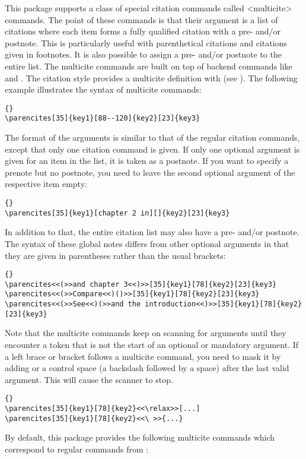 This package supports a class of special citation commands called <multicite> commands. The point of these commands is that their argument is a list of citations where each item forms a fully qualified citation with a pre- and\slash or postnote. This is particularly useful with parenthetical citations and citations given in footnotes. It is also possible to assign a pre- and\slash or postnote to the entire list. The multicite commands are built on top of backend commands like  and . The citation style provides a multicite definition with  (see ). The following example illustrates the syntax of multicite commands:

\begin{lstlisting}[style=latex]{}
\parencites[35]{key1}[88--120]{key2}[23]{key3}
\end{lstlisting}
%
The format of the arguments is similar to that of the regular citation commands, except that only one citation command is given. If only one optional argument is given for an item in the list, it is taken as a postnote. If you want to specify a prenote but no postnote, you need to leave the second optional argument of the respective item empty:

\begin{lstlisting}[style=latex]{}
\parencites[35]{key1}[chapter 2 in][]{key2}[23]{key3}
\end{lstlisting}
%
In addition to that, the entire citation list may also have a pre- and\slash or postnote. The syntax of these global notes differs from other optional arguments in that they are given in parentheses rather than the usual brackets:

\begin{lstlisting}[style=latex]{}
\parencites<<(>>and chapter 3<<)>>[35]{key1}[78]{key2}[23]{key3}
\parencites<<(>>Compare<<)()>>[35]{key1}[78]{key2}[23]{key3}
\parencites<<(>>See<<)(>>and the introduction<<)>>[35]{key1}[78]{key2}[23]{key3}
\end{lstlisting}
%
Note that the multicite commands keep on scanning for arguments until they encounter a token that is not the start of an optional or mandatory argument. If a left brace or bracket follows a multicite command, you need to mask it by adding  or a control space (a backslash followed by a space) after the last valid argument. This will cause the scanner to stop.

\begin{lstlisting}[style=latex,showspaces]{}
\parencites[35]{key1}[78]{key2}<<\relax>>[...]
\parencites[35]{key1}[78]{key2}<<\ >>{...}
\end{lstlisting}
%
By default, this package provides the following multicite commands which correspond to regular commands from :

